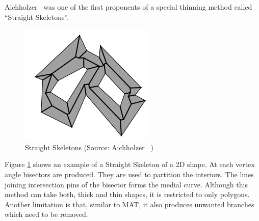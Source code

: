 Aichholzer~\cite{Aichholzer1991, Aichholzer2006} was one of the first proponents of a special thinning method called ``Straight Skeletons''. 


	\begin{figure} [!h]
		\centering
		\includegraphics[width=0.4\linewidth]{..//Common/images/Straight}
		\caption{Straight Skeletons (Source: Aichholzer~\cite{Aichholzer1991} )}
		\label{fig:litsurvey:straight}
	\end{figure}
	

Figure \ref{fig:litsurvey:straight} shows an example of a Straight Skeleton of a 2D shape. At each vertex angle bisectors are produced. They are used to partition the interiors. The lines joining intersection pins of the bisector forms the medial curve. Although this method can take both, thick and thin shapes, it is restricted to only polygons. Another limitation is that, similar to MAT, it also produces unwanted branches which need to be removed.


